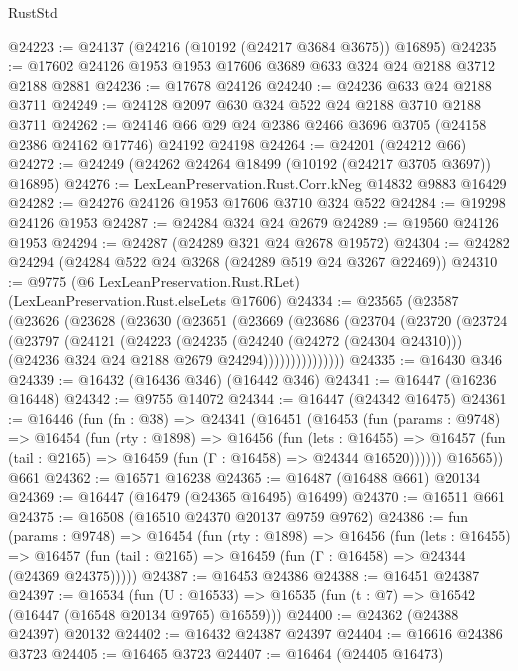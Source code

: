 \begin{lexlean}{RustStd}
\begin{coremodule}
@24223 := @24137 (@24216 (@10192 (@24217 @3684 @3675)) @16895)
@24235 := @17602 @24126 @1953 @1953 @17606 @3689 @633 @324 @24 @2188 @3712 @2188 @2881
@24236 := @17678 @24126
@24240 := @24236 @633 @24 @2188 @3711
@24249 := @24128 @2097 @630 @324 @522 @24 @2188 @3710 @2188 @3711
@24262 := @24146 @66 @29 @24 @2386 @2466 @3696 @3705 (@24158 @2386 @24162 @17746) @24192 @24198
@24264 := @24201 (@24212 @66)
@24272 := @24249 (@24262 @24264 @18499 (@10192 (@24217 @3705 @3697)) @16895)
@24276 := LexLeanPreservation.Rust.Corr.kNeg @14832 @9883 @16429
@24282 := @24276 @24126 @1953 @17606 @3710 @324 @522
@24284 := @19298 @24126 @1953
@24287 := @24284 @324 @24 @2679
@24289 := @19560 @24126 @1953
@24294 := @24287 (@24289 @321 @24 @2678 @19572)
@24304 := @24282 @24294 (@24284 @522 @24 @3268 (@24289 @519 @24 @3267 @22469))
@24310 := @9775 (@6 LexLeanPreservation.Rust.RLet) (LexLeanPreservation.Rust.elseLets @17606)
@24334 := @23565
    (@23587
      (@23626
        (@23628
          (@23630
            (@23651
              (@23669
                (@23686
                  (@23704
                    (@23720
                      (@23724
                        (@23797
                          (@24121
                            (@24223
                              (@24235
                                (@24240 (@24272 (@24304 @24310)))
                                (@24236 @324 @24 @2188 @2679 @24294)))))))))))))))
@24335 := @16430 @346
@24339 := @16432 (@16436 @346) (@16442 @346)
@24341 := @16447 (@16236 @16448)
@24342 := @9755 @14072
@24344 := @16447 (@24342 @16475)
@24361 := @16446
    (fun (fn : @38) =>
    @24341
      (@16451
        (@16453
          (fun (params : @9748) =>
          @16454
            (fun (rty : @1898) =>
            @16456
              (fun (lets : @16455) =>
              @16457 (fun (tail : @2165) => @16459 (fun (Γ : @16458) => @24344 @16520))))))
        @16565))
    @661
@24362 := @16571 @16238
@24365 := @16487 (@16488 @661) @20134
@24369 := @16447 (@16479 (@24365 @16495) @16499)
@24370 := @16511 @661
@24375 := @16508 (@16510 @24370 @20137 @9759 @9762)
@24386 := fun (params : @9748) =>
  @16454
    (fun (rty : @1898) =>
    @16456
      (fun (lets : @16455) =>
      @16457 (fun (tail : @2165) => @16459 (fun (Γ : @16458) => @24344 (@24369 @24375)))))
@24387 := @16453 @24386
@24388 := @16451 @24387
@24397 := @16534
    (fun (U : @16533) => @16535 (fun (t : @7) => @16542 (@16447 (@16548 @20134 @9765) @16559)))
@24400 := @24362 (@24388 @24397) @20132
@24402 := @16432 @24387 @24397
@24404 := @16616 @24386 @3723
@24405 := @16465 @3723
@24407 := @16464 (@24405 @16473)

\end{coremodule}
\end{lexlean}

